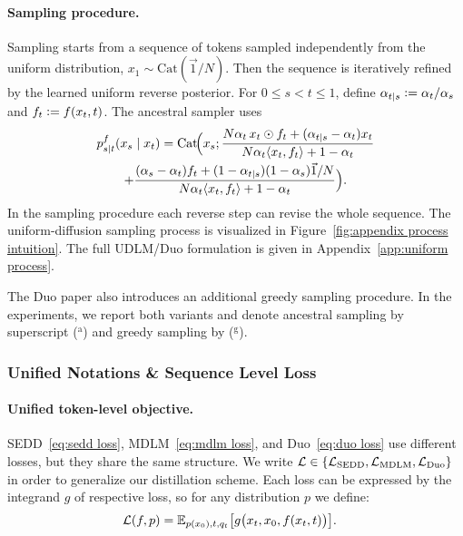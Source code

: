     \paragraph{Sampling procedure.}
    Sampling starts from a sequence of tokens sampled independently from the uniform distribution, $x_1\sim\mathrm{Cat}(\vec{1}/N)$. Then the sequence is iteratively refined by the learned uniform reverse posterior. For $0\leq s<t\leq1$, define $\alpha_{t\mid s}\vcentcolon=\alpha_t/\alpha_s$ and $f_t\vcentcolon=f(x_t,t)$. The ancestral sampler uses
    \begin{gather}
    \label{eq:uniform reversed}
    p^f_{s\mid t}(x_s\mid x_t) =
        \mathrm{Cat}\!\Bigl(x_s;
        \frac{N\alpha_t\,x_t\odot f_t
        +(\alpha_{t\mid s}-\alpha_t)x_t}{N\alpha_t\langle x_t,f_t\rangle+1-\alpha_t} \nonumber \\[-1pt]
        +\frac{(\alpha_s-\alpha_t)f_t
        +(1-\alpha_{t\mid s})(1-\alpha_s)\vec{1}/N}{{N\alpha_t\langle x_t,f_t\rangle+1-\alpha_t}} \Bigr). \nonumber
    \end{gather}
    \noindent In the sampling procedure each reverse step can revise the whole sequence.
    The uniform-diffusion sampling process is visualized in Figure~\ref{fig:appendix process intuition}. The full UDLM/Duo formulation is given in Appendix~\ref{app:uniform process}.
    
    The Duo paper also introduces an additional greedy sampling procedure. In the experiments, we report both variants and denote ancestral sampling by superscript ($^{\mathrm{a}}$) and greedy sampling by ($^{\mathrm{g}}$).


\subsubsection{Unified Notations \& Sequence Level Loss}
\label{sec:unified notations sequence loss}
    \paragraph{Unified token-level objective.}
    SEDD~\eqref{eq:sedd loss}, MDLM~\eqref{eq:mdlm loss}, and Duo~\eqref{eq:duo loss} use different losses, but they share the same structure. We write $\mathcal{L} \in \{\mathcal{L}_{\text{SEDD}}, \mathcal{L}_{\text{MDLM}}, \mathcal{L}_{\text{Duo}}\}$ in order to generalize our distillation scheme. Each loss can be expressed by the integrand $g$ of respective loss, so for any distribution $p$ we define:
    \[
    \begin{aligned}
    \mathcal{L}(f,p)
    &=
    \mathbb{E}_{p(x_0), t, q_t}\bigl[
        g\bigl(x_t,x_0,f(x_t,t)\bigr)
    \bigr].
    \end{aligned}
    \]

